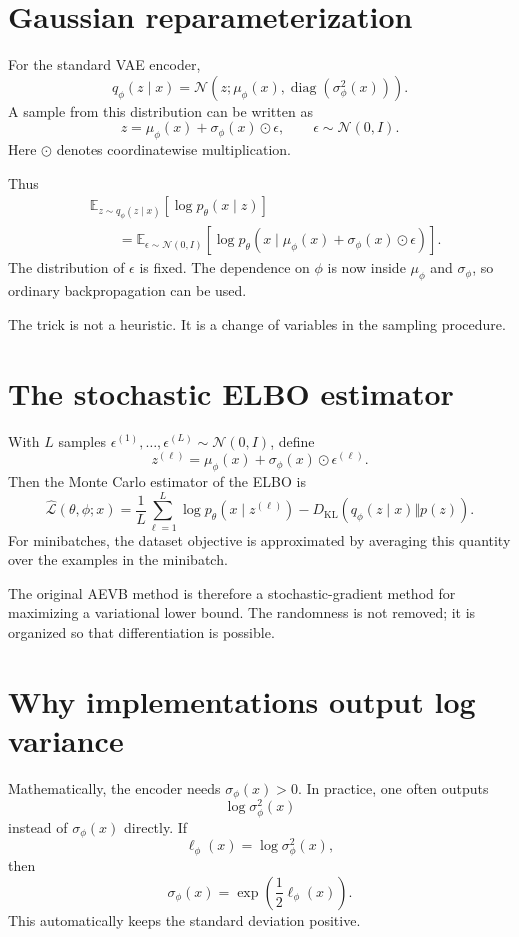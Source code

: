 \section{Gaussian reparameterization}

For the standard VAE encoder,
\[
  q_\phi(z\mid x)=\mathcal N(z;\mu_\phi(x),\operatorname{diag}(\sigma_\phi^2(x))).
\]
A sample from this distribution can be written as
\[
  z=\mu_\phi(x)+\sigma_\phi(x)\odot\epsilon,
  \qquad
  \epsilon\sim\mathcal N(0,I).
\]
Here \(\odot\) denotes coordinatewise multiplication.

Thus
\[
\begin{aligned}
&\mathbb E_{z\sim q_\phi(z\mid x)}[\log p_\theta(x\mid z)]\\
&\qquad =
\mathbb E_{\epsilon\sim\mathcal N(0,I)}
\left[
\log p_\theta(x\mid \mu_\phi(x)+\sigma_\phi(x)\odot\epsilon)
\right].
\end{aligned}
\]
The distribution of \(\epsilon\) is fixed.  The dependence on \(\phi\) is now inside \(\mu_\phi\) and \(\sigma_\phi\), so ordinary backpropagation can be used.

The trick is not a heuristic.  It is a change of variables in the sampling procedure.

\section{The stochastic ELBO estimator}

With \(L\) samples \(\epsilon^{(1)},\ldots,\epsilon^{(L)}\sim\mathcal N(0,I)\), define
\[
  z^{(\ell)}=\mu_\phi(x)+\sigma_\phi(x)\odot\epsilon^{(\ell)}.
\]
Then the Monte Carlo estimator of the ELBO is
\[
  \widehat{\mathcal L}(\theta,\phi;x)
  =\frac1L\sum_{\ell=1}^L
  \log p_\theta(x\mid z^{(\ell)})
  -D_{\mathrm{KL}}(q_\phi(z\mid x)\Vert p(z)).
\]
For minibatches, the dataset objective is approximated by averaging this quantity over the examples in the minibatch.

The original AEVB method is therefore a stochastic-gradient method for maximizing a variational lower bound.  The randomness is not removed; it is organized so that differentiation is possible.

\section{Why implementations output log variance}

Mathematically, the encoder needs \(\sigma_\phi(x)>0\).  In practice, one often outputs
\[
  \log\sigma_\phi^2(x)
\]
instead of \(\sigma_\phi(x)\) directly.  If
\[
  \ell_\phi(x)=\log\sigma_\phi^2(x),
\]
then
\[
  \sigma_\phi(x)=\exp\left(\frac12\ell_\phi(x)\right).
\]
This automatically keeps the standard deviation positive.

